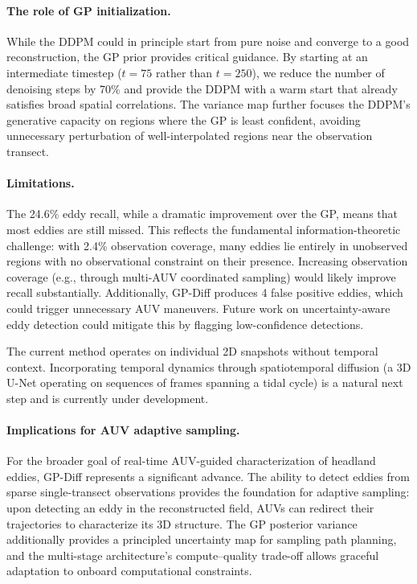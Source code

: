 \documentclass{article}
\begin{document}
\paragraph{The role of GP initialization.}
While the DDPM could in principle start from pure noise and converge to a good reconstruction, the GP prior provides critical guidance. By starting at an intermediate timestep ($t=75$ rather than $t=250$), we reduce the number of denoising steps by 70\% and provide the DDPM with a warm start that already satisfies broad spatial correlations. The variance map further focuses the DDPM's generative capacity on regions where the GP is least confident, avoiding unnecessary perturbation of well-interpolated regions near the observation transect.

\paragraph{Limitations.}
The 24.6\% eddy recall, while a dramatic improvement over the GP, means that most eddies are still missed. This reflects the fundamental information-theoretic challenge: with 2.4\% observation coverage, many eddies lie entirely in unobserved regions with no observational constraint on their presence. Increasing observation coverage (e.g., through multi-AUV coordinated sampling) would likely improve recall substantially. Additionally, GP-Diff produces 4 false positive eddies, which could trigger unnecessary AUV maneuvers. Future work on uncertainty-aware eddy detection could mitigate this by flagging low-confidence detections.

The current method operates on individual 2D snapshots without temporal context. Incorporating temporal dynamics through spatiotemporal diffusion (a 3D U-Net operating on sequences of frames spanning a tidal cycle) is a natural next step and is currently under development.

\paragraph{Implications for AUV adaptive sampling.}
For the broader goal of real-time AUV-guided characterization of headland eddies, GP-Diff represents a significant advance. The ability to detect eddies from sparse single-transect observations provides the foundation for adaptive sampling: upon detecting an eddy in the reconstructed field, AUVs can redirect their trajectories to characterize its 3D structure. The GP posterior variance additionally provides a principled uncertainty map for sampling path planning, and the multi-stage architecture's compute--quality trade-off allows graceful adaptation to onboard computational constraints.
\end{document}
